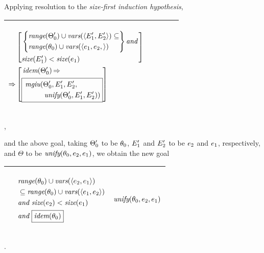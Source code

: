 \documentclass[runningheads]{llncs}
\DeclareMathOperator{\uand}{\emph{and}\,}
\DeclareMathOperator{\uimplies}{\Rightarrow}
\DeclareMathOperator{\unify}{\emph{unify}}
\DeclareMathOperator{\idem}{\emph{idem}}
\DeclareMathOperator{\mgiu}{\emph{mgiu}}
\begin{document}
Applying resolution to the \emph{size-first induction hypothesis},
  \begin{center}
  \begin{tabular}{|m{}|m{}||m{}|}
\hline
\begin{center}
{$\begin{aligned}
 &\begin{aligned}
&\begin{aligned}
&\left[\begin{aligned}
 &\left\{\begin{aligned}
 &\range(\Thet{0}') \cup \vars(\langle \E{1}', \E{2}' \rangle) \subseteq \\
  &\range(\thet{0})\cup\vars(\langle \e{1}, \e{2}, \rangle) 
  \end{aligned}\right\} \uand  \\
  &\size(\E{1}') < \size(\e{1})
  \end{aligned} \right] 
  \end{aligned} 
\end{aligned} \\
 \uimplies &\left[\begin{aligned}&\idem(\Thet{0}') \uimplies \\
 &\boxed{\begin{aligned}
    \,{\mgiu}(&\Thet{0}', \E{1}', \E{2}', \\
    &\unify(\Thet{0}', \E{1}', \E{2}')) 
\end{aligned}}
\end{aligned}\right] \end{aligned}  $}  \hspace{1cm} 
\end{center}& &  \\  \hline
\end{tabular},
\end{center}
and the above goal, taking $\Theta_{0}'$ to be $\theta_{0}$, $E_{1}'$ and $E_{2}'$ to be $ e_{2} $ and $ e_{1}$, respectively, and $\Theta$ to be $\unify(\thet{0}, \e{2}, \e{1})$, we obtain the new goal 
\begin{center}
\begin{tabular}{|m{}|m{}||m{}|}
 \hline 
  & 
 \begin{center}
{$\begin{aligned}
 &\begin{aligned}
  &\,\range(\thet{0}) \cup \vars(\langle \e{2}, \e{1}\rangle ) \\ 
  &\,  \subseteq \range(\thet{0}) \cup \vars( \langle \e{1}, \e{2}\rangle )  \\
  & \uand \size(\e{2}) < \size(\e{1})
\end{aligned}  \\
& \uand \boxed{\idem(\thet{0})} 
 \end{aligned} $}
\end{center}
& 
\begin{center}$\unify(\thet{0}, \e{2}, \e{1})$ \end{center}\\
\hline
\end{tabular}.
\end{center}
\end{document}
